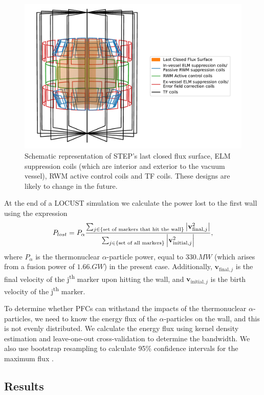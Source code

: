 \documentclass[10pt, a4paper, twoside]{article}
\begin{document}
\begin{figure}[htpb]
    \centering
    \includegraphics[width=0.7\linewidth]{Figures/coil_plot_3d.pdf}
    \caption{Schematic representation of STEP’s last closed flux surface, ELM suppression coils (which are interior and exterior to the vacuum vessel), RWM active control coils and TF coils. These designs are likely to change in the future. 
}
    \label{fig:coil_plot_3d}
\end{figure}

At the end of a LOCUST simulation we calculate the power lost to the first wall using the expression 
\begin{equation} 
P_{lost} = P_\alpha \frac{\sum_{j\in \{\text{set of markers that hit the wall}\}}\abs{\textbf{v}_{\text{final}, j}^2}}{\sum_{j \in \{\text{set of all markers}\}} \abs{\mathbf{v}_{\text{initial}, j}^2 }}, 
\end{equation}
where $P_\alpha$ is the thermonuclear $\alpha$-particle power, equal to $\si{330.MW}$ (which arises from a fusion power of $1.\si{66.GW}$) in the present case. Additionally, $\mathbf{v}_{\text{final}, j}$ is the final velocity of the j\textsuperscript{th} marker upon hitting the wall, and $\mathbf{v}_{\text{initial}, j}$ is the birth velocity of the j\textsuperscript{th} marker.

To determine whether PFCs can withstand the impacts of the thermonuclear $\alpha$-particles, we need to know the energy flux of the $\alpha$-particles on the wall, and this is not evenly distributed. We calculate the energy flux using kernel density estimation \cite{chen2017} and leave-one-out cross-validation \cite{chen2017} to determine the bandwidth. We also use bootstrap resampling to calculate 95\% confidence intervals for the maximum flux \cite{chen2017}.

\subsection{Results}
\end{document}
